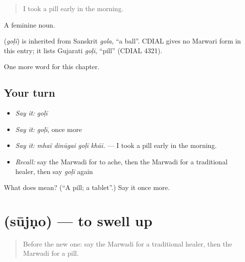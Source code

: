 \begin{quote}
I took a pill early in the morning.
\end{quote}

A feminine noun.

\begin{cousinweb}
\textbf{} (\emph{goḷī}) is inherited from Sanskrit \emph{gola}, \textquotedblleft{}a ball\textquotedblright{}. CDIAL gives no Marwari form in this entry; it lists Gujarati \emph{goḷī}, \textquotedblleft{}pill\textquotedblright{} (CDIAL 4321).
\end{cousinweb}

\begin{grammarlens}[title={What you've built}]
One more word for this chapter.
\end{grammarlens}

\subsection*{Your turn}
\begin{itemize}
\raggedright
  \item \emph{Say it:} \emph{goḷī}
  \item \emph{Say it:} \emph{goḷī}, once more
  \item \emph{Say it:} \emph{mhaĩ dinūgai goḷī khāī.} — I took a pill early in the morning.
  \item \emph{Recall:} say the Marwadi for to ache, then the Marwadi for a traditional healer, then say \emph{goḷī} again
\end{itemize}

\begin{tcolorbox}[breakable,colback=teal!4,colframe=teal!35!black,title={Before you move on}]
What does  mean? (\textquotedblleft{}A pill; a tablet\textquotedblright{}.) Say it once more.
\end{tcolorbox}
\section[\texorpdfstring{\mw{सूजणो} (sūjṇo)}{सूजणो (sūjṇo)}]{ (sūjṇo) — to swell up}

\label{lesson:MW-C254-sujno}



\begin{quote}
Before the new one: say the Marwadi for a traditional healer, then the Marwadi for a pill.
\end{quote}

